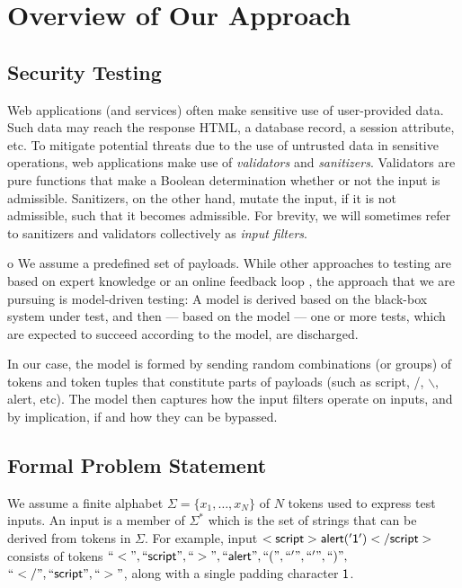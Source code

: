\section{Overview of Our Approach}

\subsection{Security Testing}

Web applications (and services) often make sensitive use of user-provided data. Such data may reach the response HTML, a database record, a session attribute, etc. To mitigate potential threats due to the use of untrusted data in sensitive operations, web applications make use of \emph{validators} and \emph{sanitizers}. Validators are pure functions that make a Boolean determination whether or not the input is admissible. Sanitizers, on the other hand, mutate the input, if it is not admissible, such that it becomes admissible. For brevity, we will sometimes refer to sanitizers and validators collectively as \emph{input filters}.

o
We assume a predefined set of payloads. While other approaches to testing are based on expert knowledge \cite{AppScan} or an online feedback loop \cite{TrippIssta:2013}, the approach that we are pursuing is model-driven testing: A model is derived based on the black-box system under test, and then --- based on the model --- one or more tests, which are expected to succeed according to the model, are discharged.

In our case, the model is formed by sending random combinations (or groups) of tokens and token tuples that constitute parts of payloads (such as {\sf script}, {\sf /}, {\sf $\backslash$}, {\sf alert}, etc). The model then captures how the input filters operate on inputs, and by implication, if and how they can be bypassed.

\subsection{Formal Problem Statement}

We assume a finite alphabet $\Sigma=\{x_1,\ldots,x_N\}$ of $N$ tokens used to express test inputs. An input is a member of $\Sigma^{*}$ which is the set of strings that can be derived from tokens in $\Sigma$. For example, input ${\sf <script>alert('1')</script>}$ consists of tokens ${\sf ``<",``script",``>",``alert",``(",``'",``'",``)",}$\\$\sf{``</",``script",``>"}$, along with a single  padding character $\sf{1}$.

